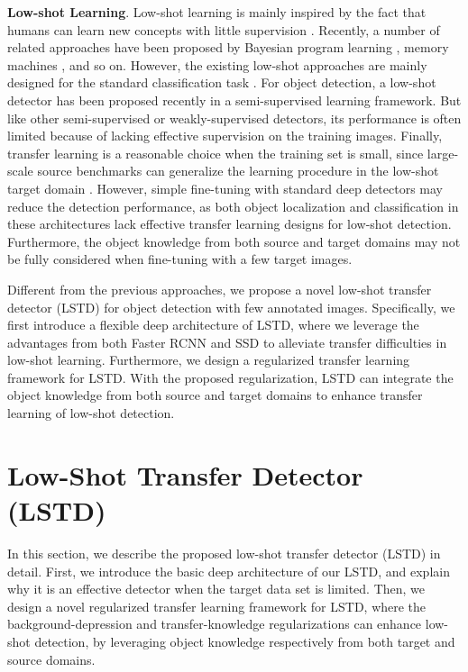 \documentclass[letterpaper]{article} \usepackage{aaai18}  \usepackage{times}  \usepackage{helvet}  \usepackage{courier}  \usepackage{url}  \usepackage{graphicx}
\begin{document}
\textbf{Low-shot Learning}.
Low-shot learning is mainly inspired by the fact that humans can learn new concepts with little supervision \cite{Lake2015}.
Recently,
a number of related approaches have been proposed by
Bayesian program learning  \cite{Lake2015},
memory machines \cite{Graves2014,Santoro2016,Vinyals2016},
and so on.
However,
the existing low-shot approaches are mainly designed for the standard classification task \cite{Xu2017,Hariharan2017}.
For object detection,
a low-shot detector \cite{dong2017few} has been proposed recently in a semi-supervised learning framework.
But like other semi-supervised \cite{Hoffman2014,Tang2016,Singh2016,Liang2016} or weakly-supervised \cite{diba2016weakly,kantorov2016contextlocnet,bilen2016weaklyddn,li2016weakly,cinbis2017} detectors,
its performance is often limited because of lacking effective supervision on the training images.
Finally,
transfer learning \cite{yosinski2014nips,Razavian2014} is a reasonable choice when the training set is small,
since large-scale source benchmarks can generalize the learning procedure in the low-shot target domain \cite{Fei2006,Hinton2015}.
However,
simple fine-tuning with standard deep detectors may reduce the detection performance,
as both object localization and classification in these architectures lack effective transfer learning designs for low-shot detection.
Furthermore,
the object knowledge from both source and target domains may not be fully considered when fine-tuning with a few target images.


Different from the previous approaches,
we propose a novel low-shot transfer detector (LSTD) for object detection with few annotated images.
Specifically,
we first introduce a flexible deep architecture of LSTD,
where
we leverage the advantages from both Faster RCNN and SSD to alleviate transfer difficulties in low-shot learning.
Furthermore,
we design a regularized transfer learning framework for LSTD.
With the proposed regularization,
LSTD can integrate the object knowledge from both source and target domains to enhance transfer learning of low-shot detection.




\section{Low-Shot Transfer Detector (LSTD)}
In this section,
we describe the proposed low-shot transfer detector (LSTD) in detail.
First,
we introduce the basic deep architecture of our LSTD,
and explain why it is an effective detector when the target data set is limited.
Then,
we design a novel regularized transfer learning framework for LSTD,
where
the background-depression and transfer-knowledge regularizations can enhance low-shot detection,
by leveraging object knowledge respectively from both target and source domains.
\end{document}
